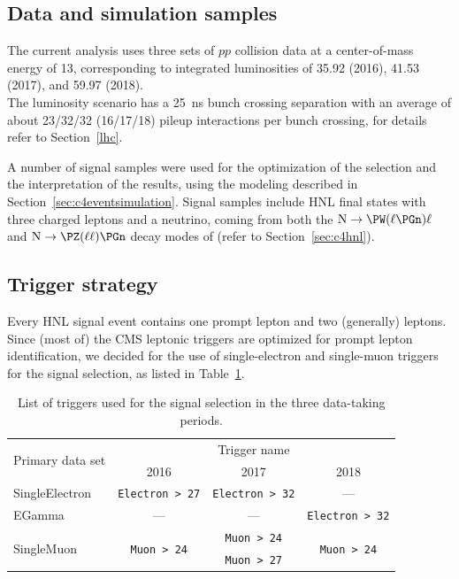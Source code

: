 \subsection{Data and simulation samples}
The current analysis uses three sets of $pp$ collision data at a
center-of-mass energy of 13\TeV, corresponding to integrated
luminosities of 35.92 \fbinv (2016), 41.53 \fbinv (2017), and 59.97 \fbinv
(2018). \\
The luminosity scenario has a 25~ns bunch crossing separation with an
average of about 23/32/32 (16/17/18)  pileup interactions per bunch crossing, for details refer to Section~\ref{lhc}.

A number of signal samples were used for the optimization of the
selection and the interpretation of the results, using the modeling
described in Section~\ref{sec:c4eventsimulation}.
Signal samples include HNL final states with three charged leptons and a
neutrino, coming from both the
$\hnl\to\PW(\ell\PGn)\ell$ and $\hnl\to\PZ(\ell\ell)\PGn$ decay modes
of \hnl (refer to Section~\ref{sec:c4hnl}).

\subsection{Trigger strategy}\label{sec:trigger}
Every HNL signal event contains one prompt lepton and two (generally)
\displ leptons. Since (most of) the CMS leptonic triggers are
optimized for prompt lepton identification,
we decided for the use of single-electron and single-muon triggers for the
signal selection, as listed in Table~\ref{tab:sgnlTriggers}.
\begin{table}[h]
{\small
  \begin{center}
    \caption{\label{tab:sgnlTriggers} List of triggers used for the
      signal selection in the three data-taking periods.}
      \begin{tabular}{|l|c|c|c|}
      \hline
      \multirow{2}{*}{Primary data set} & \multicolumn{3}{c|}{Trigger name}\\
      \cline{2-4}
      & 2016 & 2017 & 2018 \\
      \hline\hline
      SingleElectron & \texttt{\scriptsize Electron > 27} & \texttt{\scriptsize Electron > 32} & --- \\
      \hline
      EGamma         & --- & --- & \texttt{\scriptsize Electron > 32} \\
      \hline
      \multirow{2}{*}{SingleMuon} & \multirow{2}{*}{\texttt{\scriptsize Muon > 24}} & \texttt{\scriptsize Muon > 24} & \multirow{2}{*}{\texttt{\scriptsize Muon > 24}} \\
      & & \texttt{\scriptsize Muon > 27} & \\
      \hline
    \end{tabular}    
  \end{center}}
\end{table}

